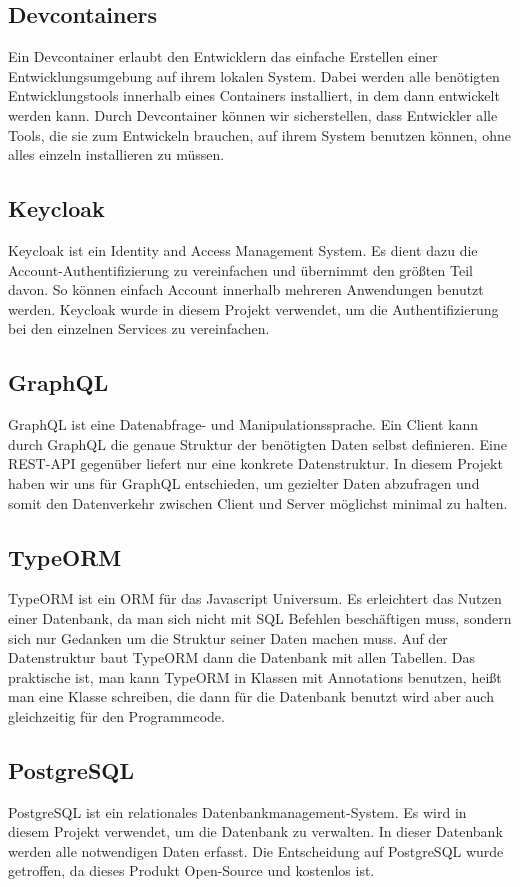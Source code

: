 \subsection{Devcontainers}
    Ein Devcontainer erlaubt den Entwicklern das einfache Erstellen einer Entwicklungsumgebung auf ihrem lokalen System.
    Dabei werden alle benötigten Entwicklungstools innerhalb eines Containers installiert, in dem dann entwickelt werden kann.
    Durch Devcontainer können wir sicherstellen, dass Entwickler alle Tools, die sie zum Entwickeln brauchen, auf ihrem System benutzen können, ohne alles einzeln installieren zu müssen.
\subsection{Keycloak}
    Keycloak ist ein Identity and Access Management System. Es dient dazu die Account-Authentifizierung zu vereinfachen und übernimmt den größten Teil davon.
    So können einfach Account innerhalb mehreren Anwendungen benutzt werden. Keycloak wurde in diesem Projekt verwendet, um die Authentifizierung bei den einzelnen Services zu vereinfachen.
\subsection{GraphQL}
    GraphQL ist eine Datenabfrage- und Manipulationssprache. Ein Client kann durch GraphQL die genaue Struktur der benötigten Daten selbst definieren.
    Eine REST-API gegenüber liefert nur eine konkrete Datenstruktur.
    In diesem Projekt haben wir uns für GraphQL entschieden, um gezielter Daten abzufragen und somit den Datenverkehr zwischen Client und Server möglichst minimal zu halten.
\subsection{TypeORM}
    TypeORM ist ein \ac{ORM} für das Javascript Universum. Es erleichtert das Nutzen einer Datenbank, da man sich nicht mit \ac{SQL} Befehlen beschäftigen muss, sondern sich nur Gedanken um die Struktur seiner Daten machen muss.
    Auf der Datenstruktur baut TypeORM dann die Datenbank mit allen Tabellen. Das praktische ist, man kann TypeORM in Klassen mit Annotations benutzen, heißt man eine Klasse schreiben, die dann für die Datenbank benutzt wird
    aber auch gleichzeitig für den Programmcode.
\subsection{PostgreSQL}
    PostgreSQL ist ein relationales Datenbankmanagement-System. Es wird in diesem Projekt verwendet, um die Datenbank zu verwalten. In dieser Datenbank werden alle notwendigen Daten erfasst.
    Die Entscheidung auf PostgreSQL wurde getroffen, da dieses Produkt Open-Source und kostenlos ist.    
